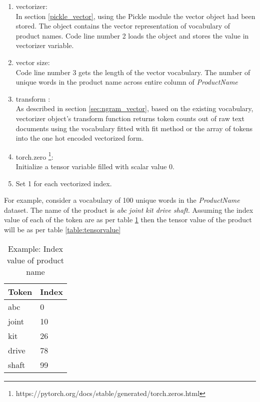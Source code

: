 \begin{enumerate}
    \item vectorizer: \\
    In section \ref{pickle_vector}, using the Pickle module the vector object had been stored. The object contains the vector representation of vocabulary of product names. Code line number 2 loads the object and stores the value in vectorizer variable.
    \item vector size: \\
    Code line number 3 gets the length of the vector vocabulary. The number of unique words in the product name across entire column of \textit{ProductName}
    \item transform : \\
    As described in section \ref{sec:ngram_vector}, based on the existing vocabulary, vectorizer object's transform function returns token counts out of raw text documents using the vocabulary fitted with fit method or the array of tokens into the one hot encoded vectorized form. 
    \item torch.zero \footnote{https://pytorch.org/docs/stable/generated/torch.zeros.html}: \\
    Initialize a tensor variable filled with scalar value 0.

    \item Set 1 for each vectorized index.
    
\end{enumerate}

For example, consider a vocabulary of 100 unique words in the \textit{ProductName} dataset. The name of the product is \textit{abc joint kit drive shaft}. Assuming the index value of each of the token are as per table \ref{table:names index} then the tensor value of the product will be as per table \ref{table:tensorvalue} 

\begin{table}[htp!]
    \centering
    \caption{Example: Index value of product name}
    \label{table:names index}
    \begin{tabular}{ ll }
          \toprule
          
          \textbf{Token} & \textbf{Index}\\
          \midrule
          abc&0\\
          joint&10\\
          kit&26\\
          drive&78\\
          shaft&99\\
                 
        
          \bottomrule
          \end{tabular}
\end{table}

